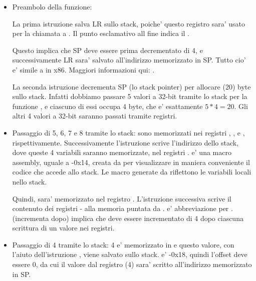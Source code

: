 \begin{itemize}
\item Preambolo della funzione:

La prima istruzione  salva \ac{LR} sullo stack, poiche' questo registro sara' usato per la chiamata a \printf.
Il punto esclamativo all fine indica il .

Questo implica che \ac{SP} deve essere prima decrementato di 4, e successivamente \ac{LR} sara' salvato all'indirizzo memorizzato in \ac{SP}.
Tutto cio' e' simile a \PUSH in x86.
Maggiori informazioni qui: .

La seconda istruzione  decrementa \ac{SP} (lo \gls{stack pointer}) per allocare  (20) byte sullo stack.
Infatti dobbiamo passare 5 valori a 32-bit tramite lo stack per la funzione \printf, e ciascuno di essi occupa 4 byte, che e' esattamente $5*4=20$.
Gli altri 4 valori a 32-bit saranno passati tramite registri.

\item Passaggio di 5, 6, 7 e 8 tramite lo stack: sono memorizzati nei registri , ,  e , rispettivamente.
Successivamente l'istruzione  scrive l'indirizzo dello stack, dove queste 4 variabili saranno memorizzate,
nel registri .
 e' una macro assembly, uguale a -0x14, creata da \IDA per visualizzare in maniera conveniente il codice che accede allo stack.
Le macro  generate da \IDA riflettono le variabili locali nello stack.

Quindi,  sara' memorizzato nel registro .
L'istruzione successiva  scrive il contenuto dei registri - alla memoria puntata da .
 e' abbreviazione per . 
 (incrementa dopo) implica che  deve essere incrementato di 4 dopo ciascuna scrittura di un valore nei registri.

\item Passaggio di 4 tramite lo stack: 4 e' memorizzato in  e questo valore, con l'aiuto dell'istruzione , viene salvato sullo stack.
 e' -0x18, quindi l'offset deve essere 0, da cui il valore dal registro  (4) sara' scritto all'indirizzo memorizzato in \ac{SP}.


\end{itemize}
